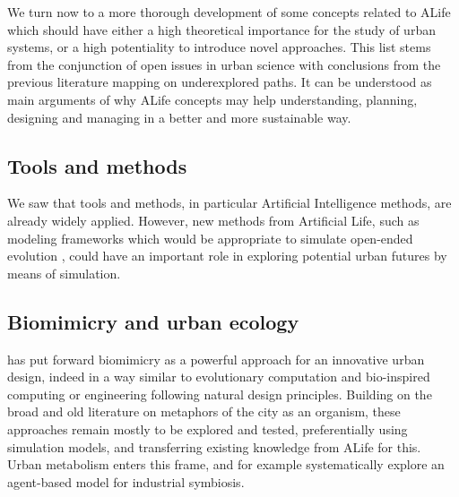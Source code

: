 \documentclass[letterpaper]{article}
\begin{document}
We turn now to a more thorough development of some concepts related to ALife which should have either a high theoretical importance for the study of urban systems, or a high potentiality to introduce novel approaches. This list stems from the conjunction of open issues in urban science \citep{lobo2020urban} with conclusions from the previous literature mapping on underexplored paths. It can be understood as main arguments of why ALife concepts may help understanding, planning, designing and managing in a better and more sustainable way.






\subsection{Tools and methods}


We saw that tools and methods, in particular Artificial Intelligence methods, are already widely applied. However, new methods from Artificial Life, such as modeling frameworks which would be appropriate to simulate open-ended evolution \citep{banzhaf2016defining}, could have an important role in exploring potential urban futures by means of simulation.

\subsection{Biomimicry and urban ecology}


\cite{taylor2017art} has put forward biomimicry as a powerful approach for an innovative urban design, indeed in a way similar to evolutionary computation and bio-inspired computing or engineering following natural design principles. Building on the broad and old literature on metaphors of the city as an organism, these approaches remain mostly to be explored and tested, preferentially using simulation models, and transferring existing knowledge from ALife for this. Urban metabolism enters this frame, and \cite{raimbault2020spatial} for example systematically explore an agent-based model for industrial symbiosis.
\end{document}
